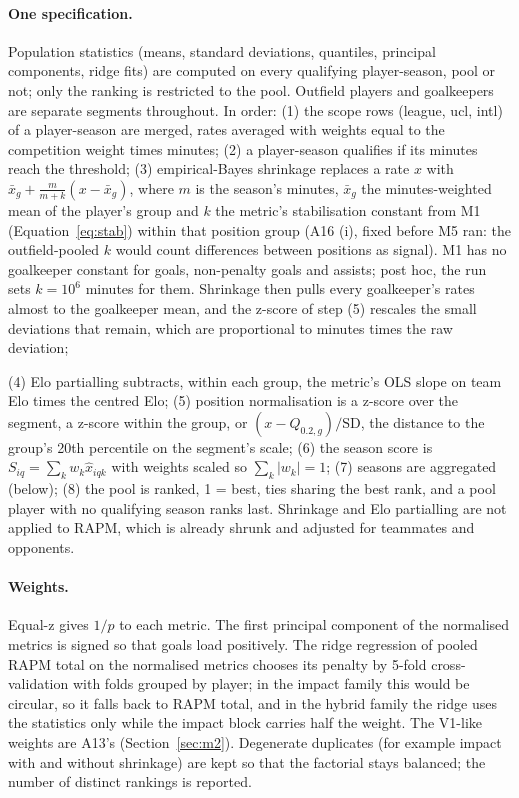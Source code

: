 \documentclass[11pt,a4paper]{article}
\begin{document}
\paragraph{One specification.}
Population statistics (means, standard deviations, quantiles, principal
components, ridge fits) are computed on every qualifying player-season,
pool or not; only the ranking is restricted to the pool. Outfield players and
goalkeepers are separate segments throughout. In order:
(1) the scope rows (league, ucl, intl) of a player-season are merged, rates
averaged with weights equal to the competition weight times minutes;
(2) a player-season qualifies if its minutes reach the threshold;
(3) empirical-Bayes shrinkage \citep{efron1975stein} replaces a rate $x$ with
$\bar x_g + \frac{m}{m+k}(x - \bar x_g)$, where $m$ is the season's minutes,
$\bar x_g$ the minutes-weighted mean of the player's group and $k$ the metric's
stabilisation constant from M1 (Equation~\eqref{eq:stab}) within that position
group (A16 (i), fixed before M5 ran: the outfield-pooled $k$ would count
differences between positions as signal). M1 has no goalkeeper constant for
goals, non-penalty goals and assists; post hoc, the run sets $k = 10^6$
minutes for them. Shrinkage then pulls every goalkeeper's rates almost to the
goalkeeper mean, and the z-score of step (5) rescales the small deviations
that remain, which are proportional to minutes times the raw deviation;

(4) Elo partialling subtracts, within each group, the metric's OLS slope on
team Elo times the centred Elo;
(5) position normalisation is a z-score over the segment, a z-score within the
group, or $(x - Q_{0.2,g}) / \mathrm{SD}$, the distance to the group's 20th
percentile on the segment's scale;
(6) the season score is $S_{iq} = \sum_k w_k \hat x_{iqk}$ with weights scaled
so $\sum_k |w_k| = 1$;
(7) seasons are aggregated (below);
(8) the pool is ranked, 1 = best, ties sharing the best rank, and a pool player
with no qualifying season ranks last. Shrinkage and Elo partialling are not
applied to RAPM, which is already shrunk and adjusted for teammates and
opponents.

\paragraph{Weights.}
Equal-z gives $1/p$ to each metric. The first principal component of the
normalised metrics is signed so that goals load positively. The ridge
regression of pooled RAPM total on the normalised metrics chooses its penalty
by 5-fold cross-validation with folds grouped by player; in the impact family
this would be circular, so it falls back to RAPM total, and in the hybrid
family the ridge uses the statistics only while the impact block carries half
the weight. The V1-like weights are A13's (Section~\ref{sec:m2}). Degenerate
duplicates (for example impact with and without shrinkage) are kept so that
the factorial stays balanced; the number of distinct rankings is reported.
\end{document}
